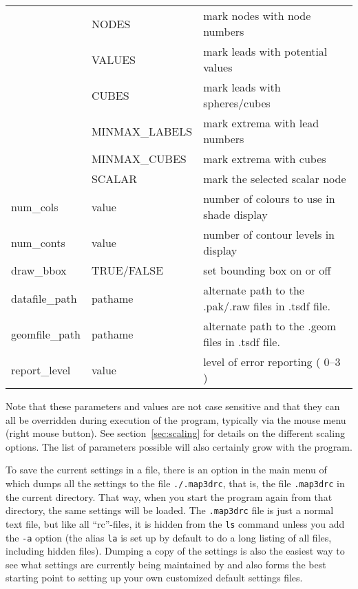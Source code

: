 \begin{center}
\begin{tabular}{|l|l|p{3.2in}|}
              & NODES          & mark nodes with node numbers\\
              & VALUES         & mark leads with potential values\\
              & CUBES          & mark leads with spheres/cubes \\
              & MINMAX\_LABELS & mark extrema with lead numbers \\
              & MINMAX\_CUBES  & mark extrema with cubes \\
              & SCALAR         & mark the selected scalar node \\
\hline
num\_cols      & value    & number of colours to use in shade display\\ \hline
num\_conts     & value    & number of contour levels in display\\ \hline
draw\_bbox     & TRUE/FALSE & set bounding box on or off \\ \hline
datafile\_path & pathame  & alternate path to the .pak/.raw files 
in .tsdf file. \\ \hline
geomfile\_path & pathame  & alternate path to the .geom files 
in .tsdf file. \\ \hline
report\_level  & value    & level of error reporting ( 0--3 ) \\ \hline
\end{tabular}
\end{center}


Note that these parameters and values are not case sensitive and that they
can all be overridden during execution of the program, typically via the
mouse menu (right mouse button).  See section~\ref{sec:scaling} for details
on the different scaling options.  The list of parameters possible will
also certainly grow with the program.

To save the current settings in a file, there is an option in the main menu
of \map{} which dumps all the settings to the file {\tt ./.map3drc}, that
is, the file {\tt .map3drc} in the current directory.  That way, when you
start the program again from that directory, the same settings will be loaded.
The {\tt .map3drc} file is just a normal text file, but like all
``rc''-files, it is hidden from the {\tt ls} command unless you add the
{\tt -a} option (the alias {\tt la} is set up by default to do a long
listing of all files, including hidden files).  Dumping a copy of the
settings is also the easiest way to see what settings are currently being
maintained by \map{} and also forms the best starting point to setting up
your own customized default settings files.

